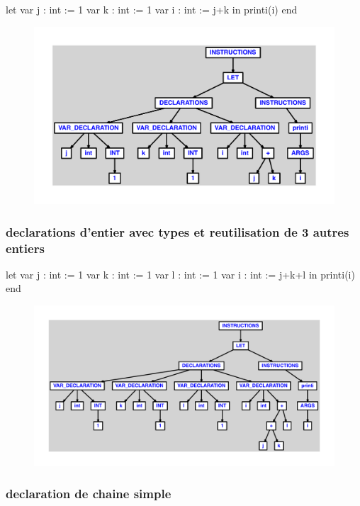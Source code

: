 \documentclass{article}
\begin{document}
\begin{verbatimtab}
let
	var j : int := 1
	var k : int := 1
	var i : int := j+k
in
	printi(i)
end
\end{verbatimtab}
\begin{figure}[H]\centering\includegraphics[max width=\textwidth]{ast/ast_298.pdf}\end{figure}\subsubsection{declarations d'entier avec types et reutilisation de 3 autres entiers}
\begin{verbatimtab}
let
	var j : int := 1
	var k : int := 1
	var l : int := 1
	var i : int := j+k+l
in
	printi(i)
end
\end{verbatimtab}
\begin{figure}[H]\centering\includegraphics[max width=\textwidth]{ast/ast_299.pdf}\end{figure}\subsubsection{declaration de chaine simple}
\end{document}
